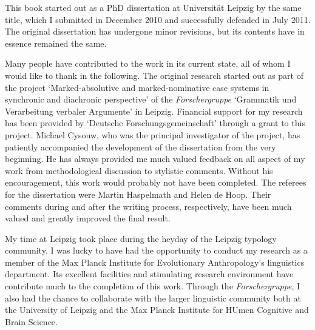 



This book started out as a PhD dissertation at Universit\"at Leipzig by the same title, which I submitted in December 2010 and successfully defended in July 2011. 
The original dissertation has undergone minor revisions, but its contents have in essence remained the same.

Many people have contributed to the work in its current state, all of whom I would like to thank in the following.
The original research started out as part of the  project `Marked-absolutive and marked-nominative case systems in synchronic and diachronic perspective' of the \textit{Forschergruppe} `Grammatik und Verarbeitung verbaler Argumente' in Leipzig. 
Financial support for my research has been provided by `Deutsche Forschungsgemeinschaft' through a grant to this project.
Michael Cysouw, who was the principal investigator of the project, has patiently accompanied the development of the dissertation from the very beginning. 
He has always provided me much valued feedback on all aspect of my work from methodological discussion to stylistic comments.  
Without his encouragement, this work would probably not have been completed.
The referees for the dissertation were Martin Haspelmath and Helen de Hoop.
Their comments during and after the writing process, respectively, have been much valued and greatly improved the final result. 
 
My time at Leipzig took place during the heyday of the Leipzig typology community.
I was lucky to have had the opportunity to conduct my research as a member of the Max Planck Institute for Evolutionary Anthropology's linguistics department.
Its excellent facilities and stimulating research environment have contribute much to the completion of this work. 
Through the \textit{Forschergruppe}, I also had the chance to collaborate with the larger linguistic community both at the University of Leipzig and the Max Planck Institute for HUmen Cognitive and Brain Science.

